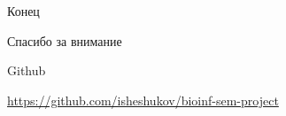 \documentclass[
  russian,
  ignorenonframetext,
]{beamer}
\begin{document}
\begin{frame}[standout]{Конец}
\protect\hypertarget{ux43aux43eux43dux435ux446}{}

Спасибо за внимание

\end{frame}

\begin{frame}[standout]{Github}
\protect\hypertarget{ux43aux43eux43dux435ux446}{}

\begin{figure}
	\centering
	\end{figure}
	\url{https://github.com/isheshukov/bioinf-sem-project}

\end{frame}
\end{document}
